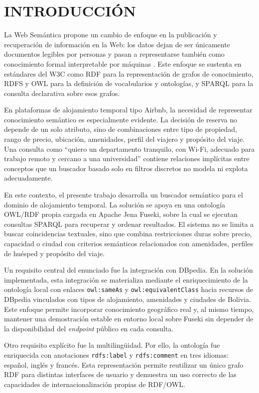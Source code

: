 \section{INTRODUCCIÓN}

La Web Semántica propone un cambio de enfoque en la publicación y recuperación de
información en la Web: los datos dejan de ser únicamente documentos legibles por
personas y pasan a representarse también como conocimiento formal interpretable por
máquinas \parencite{berners-lee2001}. Este enfoque se sustenta en estándares del W3C
como RDF para la representación de grafos de conocimiento, RDFS y OWL para la
definición de vocabularios y ontologías, y SPARQL para la consulta declarativa sobre
esos grafos.

En plataformas de alojamiento temporal tipo Airbnb, la necesidad de representar
conocimiento semántico es especialmente evidente. La decisión de reserva no depende de
un solo atributo, sino de combinaciones entre tipo de propiedad, rango de precio,
ubicación, amenidades, perfil del viajero y propósito del viaje. Una consulta como
``quiero un departamento tranquilo, con Wi-Fi, adecuado para trabajo remoto y cercano a
una universidad'' contiene relaciones implícitas entre conceptos que un buscador basado
solo en filtros discretos no modela ni explota adecuadamente.

En este contexto, el presente trabajo desarrolla un buscador semántico para el dominio
de alojamiento temporal. La solución se apoya en una ontología OWL/RDF propia cargada
en Apache Jena Fuseki, sobre la cual se ejecutan consultas SPARQL para recuperar y
ordenar resultados. El sistema no se limita a buscar coincidencias textuales, sino que
combina restricciones duras sobre precio, capacidad o ciudad con criterios semánticos
relacionados con amenidades, perfiles de huésped y propósito del viaje.

Un requisito central del enunciado fue la integración con DBpedia. En la solución
implementada, esta integración se materializa mediante el enriquecimiento de la
ontología local con enlaces \texttt{owl:sameAs} y \texttt{owl:equivalentClass} hacia
recursos de DBpedia vinculados con tipos de alojamiento, amenidades y ciudades de
Bolivia. Este enfoque permite incorporar conocimiento geográfico real y, al mismo
tiempo, mantener una demostración estable en entorno local sobre Fuseki sin depender de
la disponibilidad del \textit{endpoint} público en cada consulta.

Otro requisito explícito fue la multilingüidad. Por ello, la ontología fue enriquecida
con anotaciones \texttt{rdfs:label} y \texttt{rdfs:comment} en tres idiomas:
español, inglés y francés. Esta representación permite reutilizar un único grafo RDF
para distintas interfaces de usuario y demuestra un uso correcto de las capacidades de
internacionalización propias de RDF/OWL.

